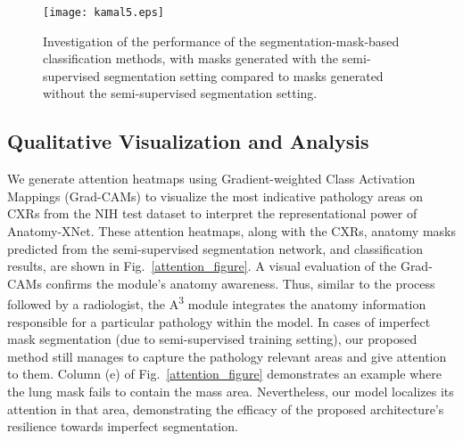 \documentclass[journal]{IEEEtran}
\begin{document}
\begin{figure}[t]
    \centering
	\texttt{[image: kamal5.eps]}
    \caption{Investigation of the performance of the segmentation-mask-based classification methods, with masks generated with the semi-supervised segmentation setting compared to masks generated without the semi-supervised segmentation setting.}
    \label{fig: segmentation mask impact comparison bar plot}
\end{figure}

\subsection{Qualitative Visualization and Analysis}
\label{attention_region_attention_vector_analysis}
We generate attention heatmaps using Gradient-weighted Class Activation Mappings (Grad-CAMs) \cite{8237336} to visualize the most indicative pathology areas on CXRs from the NIH test dataset to interpret the representational power of Anatomy-XNet. These attention heatmaps, along with the CXRs, anatomy masks predicted from the semi-supervised segmentation network, and classification results, are shown in Fig.~\ref{attention_figure}. A visual evaluation of the Grad-CAMs confirms the module's anatomy awareness. Thus, similar to the process followed by a radiologist, the A\textsuperscript{3} module integrates the anatomy information responsible for a particular pathology within the model. In cases of imperfect mask segmentation (due to semi-supervised training setting), our proposed method still manages to capture the pathology relevant areas and give attention to them. Column (e) of Fig.~\ref{attention_figure} demonstrates an example where the lung mask fails to contain the mass area. Nevertheless, our model localizes its attention in that area, demonstrating the efficacy of the proposed architecture's resilience towards imperfect segmentation.
\end{document}

